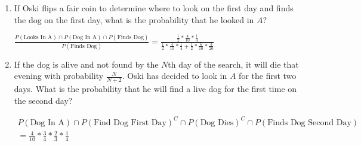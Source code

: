 \begin{enumerate}[label=(\alph*)]
\item If Oski flips a fair coin to determine where to look on the first 
day and finds the dog on the first day, what is the probability that he 
looked in $A$?
\begin{solution}[3cm]
$\frac{P(\text{Looks In A}) \cap P(\text{Dog In A}) \cap 
P(\text{Finds Dog})}{P(\text{Finds Dog})} 
= \frac{\frac{1}{2} * \frac{4}{10} * \frac{1}{4}}{\frac{1}{2} * 
\frac{4}{10} * \frac{1}{4} + \frac{1}{2} * \frac{6}{10} * \frac{3}{20}}$
\end{solution}
                        
\item  If the dog is alive and not found by the $N$th day of the search, 
it will die that evening with probability $\frac{N}{N+2}$. Oski has 
decided to look in $A$ for the first two days. What is the probability 
that he will find a live dog for the first time on the second day? 
\begin{solution}[2cm]
\begin{multline}
P(\text{Dog In A}) \cap P(\text{Find Dog First Day})^{C} \cap \nonumber
P(\text{Dog Dies})^{C} \cap 
P(\text{Finds Dog Second Day}) \\
= \frac{4}{10} * \frac{3}{4} * \frac{2}{3} * \frac{1}{4}
\end{multline}
\end{solution}
\end{enumerate}